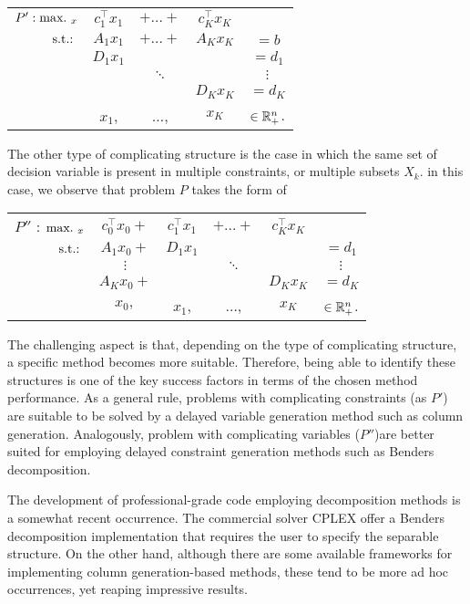 \begin{center}
	\begin{tabular}{rcccc}
	    $P':  \mathop{\text{max.~}}_x$ & $c_1^\top x_1$ & $+\dots+$ & $c_K^\top x_K$ & \\
	            $\mathop{\text{s.t.:~}}$  & $A_1x_1$ & $+\dots+$ & $A_Kx_K$ & $=b$ \\
	                   & $D_1x_1$ &           &          & $= d_1$ \\
	                   &          & $\ddots$  &          & $\vdots$ \\
	                   &          &           & $D_Kx_K$ & $= d_K$ \\
	                   &  $x_1$,  & $\dots$,  & $x_K$ & $\in \mathbb{R}^n_+$. 
	\end{tabular}
\end{center}

The other type of complicating structure is the case in which the same set of decision variable is present in multiple constraints, or multiple subsets $X_k$. in this case, we observe that problem $P$ takes the form of
%
\begin{center}
	\begin{tabular}{rccccc}
	$P''$ : $\mathop{\text{max.~}}_x$ & $c_0^\top x_0 +$ &  $c_1^\top x_1$ & $+\dots+$ & $c_K^\top x_K$ & \\
        $\mathop{\text{s.t.:~}}$  & $A_1x_0+$ & $D_1x_1$ &           &          & $= d_1$ \\
               & $\vdots$  &          & $\ddots$  &          & $\vdots$ \\
               & $A_Kx_0+$ &          &           & $D_Kx_K$ & $= d_K$ \\
               & $x_0,$    &  $x_1$,  & $\dots$,  & $x_K$    & $\in \mathbb{R}^n_+$. 
	\end{tabular}
\end{center}
%
The challenging aspect is that, depending on the type of complicating structure, a specific method becomes more suitable. Therefore, being able to identify these structures is one of the key success factors in terms of the chosen method performance. As a general rule, problems with complicating constraints (as $P'$) are suitable to be solved by a delayed variable generation method such as column generation. Analogously, problem with complicating variables ($P''$)are better suited for employing delayed constraint generation methods such as Benders decomposition. 

The development of professional-grade code employing decomposition methods is a somewhat recent occurrence. The commercial solver CPLEX offer a Benders decomposition implementation that requires the user to specify the separable structure. On the other hand, although there are some available frameworks for implementing column generation-based methods, these tend to be more ad hoc occurrences, yet reaping impressive results.  


